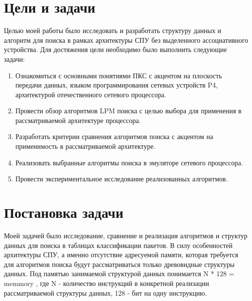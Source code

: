 \documentclass[a4peper, 12pt, titlepage, finall]{extreport}
\begin{document}
    \section{Цели и задачи}
        Целью моей работы было исследовать и разработать структуру данных и алгоритм для поиска в
        рамках архитектуры СПУ без выделенного ассоциативного устройства.
        Для достяжения цели необходимо было выполнить следующие задачи:
        \begin{enumerate}
            \item Ознакомиться с основными понятиями ПКС с акцентом на плоскость передачи данных, языком программирования сетевых устройств P4, архитектурой отечественного сетевого процессора.
            \item Провести обзор алгоритмов LPM поиска с целью выбора для применения в рассматриваемой архитектуре процессора.
            \item Разработать критерии сравнения алгоритмов поиска с акцентом на применимость в рассматриваемой архитектуре.
            \item Реализовать выбранные алгоритмы поиска в эмуляторе сетевого процессора.
            \item Провести экспериментальное исследование реализованных алгоритмов.
        \end{enumerate}
    
    \newpage

    \section{Постановка задачи}
        Моей задачей было исследование, сравнение и реализация алгоритмов и структур данных для поиска в таблицах классификации пакетов. 
        В силу особенностей архитектуры СПУ, а именно отсутствие адресуемой  памяти, 
        которая требуется для  алгоритмов поиска будут рассматриваться только древовидные структуры данных. 
        Под памятью занимаемой структурой данных понимается  {\ttfamily   N * 128 = memmory} , где {\ttfamily N} - количество 
        инструкций в конкретной реализации рассматриваемой структуры данных, 128 - бит на одну инструкцию.
\end{document}
